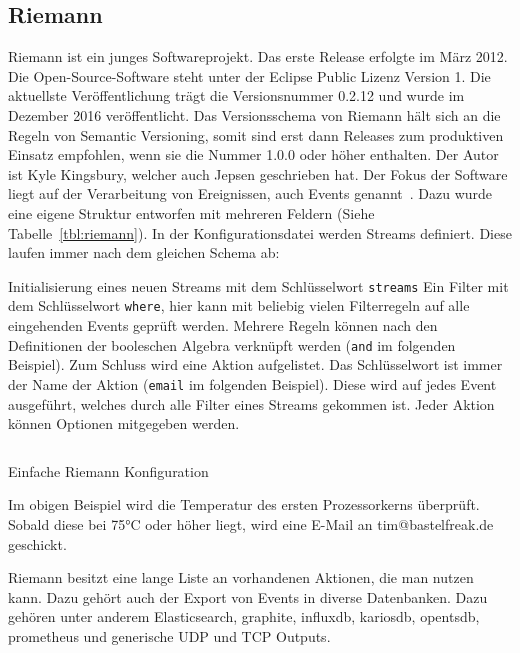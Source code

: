 \subsection{Riemann}
Riemann ist ein junges Softwareprojekt. Das erste Release erfolgte im März
2012. Die Open-Source-Software steht unter der Eclipse Public Lizenz Version 1.
Die aktuellste Veröffentlichung trägt die Versionsnummer 0.2.12 und wurde im
Dezember 2016 veröffentlicht. Das Versionsschema von Riemann hält sich an die
Regeln von \gls{Semantic Versioning}, somit sind erst dann Releases zum
produktiven Einsatz empfohlen, wenn sie die Nummer 1.0.0 oder höher enthalten.
Der Autor ist Kyle Kingsbury, welcher auch \gls{Jepsen} geschrieben hat. Der
Fokus der Software liegt auf der Verarbeitung von Ereignissen, auch Events
genannt~\cite{riemann_concepts}. Dazu wurde eine eigene Struktur entworfen mit
mehreren Feldern (Siehe Tabelle~\ref{tbl:riemann}). In der Konfigurationsdatei
werden Streams definiert. Diese laufen immer nach dem gleichen Schema ab:

\begin{outline}
  \lstset{language=Clojure}
  \1 Initialisierung eines neuen Streams mit dem Schlüsselwort
  \lstinline|streams|
  \1 Ein Filter mit dem Schlüsselwort \lstinline|where|, hier kann mit beliebig
  vielen Filterregeln auf alle eingehenden Events geprüft werden. Mehrere
  Regeln können nach den Definitionen der booleschen Algebra verknüpft werden
  (\lstinline|and| im folgenden Beispiel).
  \1 Zum Schluss wird eine Aktion aufgelistet. Das Schlüsselwort ist immer der
  Name der Aktion (\lstinline|email| im folgenden Beispiel). Diese wird auf
  jedes Event ausgeführt, welches durch alle Filter eines Streams gekommen ist.
  Jeder Aktion können Optionen mitgegeben werden.
\end{outline}

\begin{listing}
  \inputminted{clojure}{../listings/riemann-config.txt}
  \caption{Einfache Riemann Konfiguration}
\end{listing}

Im obigen Beispiel wird die Temperatur des ersten Prozessorkerns überprüft.
Sobald diese bei 75°C oder höher liegt, wird eine E-Mail an tim@bastelfreak.de
geschickt.

Riemann besitzt eine lange Liste an vorhandenen Aktionen, die man nutzen kann.
Dazu gehört auch der Export von Events in diverse Datenbanken. Dazu gehören
unter anderem Elasticsearch, graphite, influxdb, kariosdb, opentsdb, prometheus
und generische UDP und TCP Outputs.

